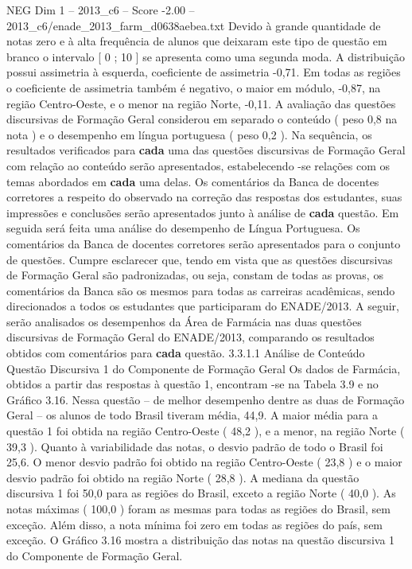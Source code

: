 \begin{textsample}{NEG Dim 1 – 2013\_c6 – Score -2.00 – 2013\_c6/enade\_2013\_farm\_d0638aebea.txt}
Devido à grande quantidade de notas zero e à alta frequência de alunos que deixaram este tipo de questão em branco o intervalo [ 0 ; 10 ] se apresenta como uma segunda moda.
A distribuição possui assimetria à esquerda, coeficiente de assimetria -0,71.
Em todas as regiões o coeficiente de assimetria também é negativo, o maior em módulo, -0,87, na região Centro-Oeste, e o menor na região Norte, -0,11.
A avaliação das questões discursivas de Formação Geral considerou em separado o conteúdo ( peso 0,8 na nota ) e o desempenho em língua portuguesa ( peso 0,2 ).
Na sequência, os resultados verificados para \textbf{cada} uma das questões discursivas de Formação Geral com relação ao conteúdo serão apresentados, estabelecendo -se relações com os temas abordados em \textbf{cada} uma delas.
Os comentários da Banca de docentes corretores a respeito do observado na correção das respostas dos estudantes, suas impressões e conclusões serão apresentados junto à análise de \textbf{cada} questão.
Em seguida será feita uma análise do desempenho de Língua Portuguesa.
Os comentários da Banca de docentes corretores serão apresentados para o conjunto de questões.
Cumpre esclarecer que, tendo em vista que as questões discursivas de Formação Geral são padronizadas, ou seja, constam de todas as provas, os comentários da Banca são os mesmos para todas as carreiras acadêmicas, sendo direcionados a todos os estudantes que participaram do ENADE/2013.
A seguir, serão analisados os desempenhos da Área de Farmácia nas duas questões discursivas de Formação Geral do ENADE/2013, comparando os resultados obtidos com comentários para \textbf{cada} questão. 3.3.1.1 Análise de Conteúdo Questão Discursiva 1 do Componente de Formação Geral Os dados de Farmácia, obtidos a partir das respostas à questão 1, encontram -se na Tabela 3.9 e no Gráfico 3.16.
Nessa questão – de melhor desempenho dentre as duas de Formação Geral – os alunos de todo Brasil tiveram média, 44,9.
A maior média para a questão 1 foi obtida na região Centro-Oeste ( 48,2 ), e a menor, na região Norte ( 39,3 ).
Quanto à variabilidade das notas, o desvio padrão de todo o Brasil foi 25,6.
O menor desvio padrão foi obtido na região Centro-Oeste ( 23,8 ) e o maior desvio padrão foi obtido na região Norte ( 28,8 ).
A mediana da questão discursiva 1 foi 50,0 para as regiões do Brasil, exceto a região Norte ( 40,0 ).
As notas máximas ( 100,0 ) foram as mesmas para todas as regiões do Brasil, sem exceção.
Além disso, a nota mínima foi zero em todas as regiões do país, sem exceção.
O Gráfico 3.16 mostra a distribuição das notas na questão discursiva 1 do Componente de Formação Geral.

\end{textsample}
